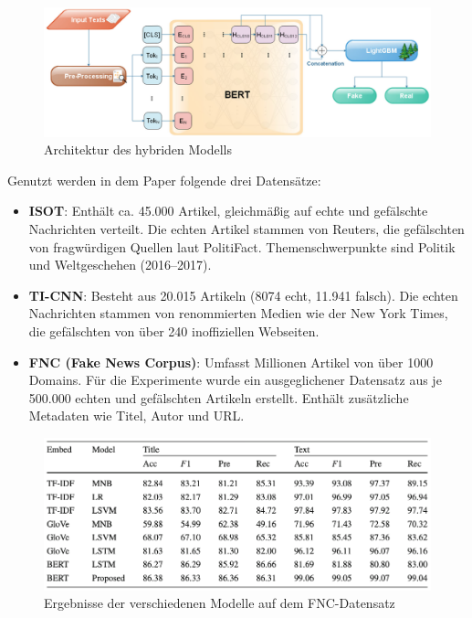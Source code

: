 \begin{figure}[htbp]
    \begin{center}
    \includegraphics[scale=0.32]{static/bert_lightgbt_architecture.png}
    \caption{\label{fig:bert_lightgbt_architecture} Architektur des hybriden Modells \cite{Essa:2023aa}}
    \end{center}
\end{figure}

Genutzt werden in dem Paper folgende drei Datensätze:
\begin{itemize}
  \item \textbf{ISOT}: Enthält ca. 45.000 Artikel, gleichmäßig auf echte und gefälschte Nachrichten verteilt. 
  Die echten Artikel stammen von Reuters, die gefälschten von fragwürdigen Quellen laut PolitiFact. 
  Themenschwerpunkte sind Politik und Weltgeschehen (2016–2017).

  \item \textbf{TI-CNN}: Besteht aus 20.015 Artikeln (8074 echt, 11.941 falsch). Die echten Nachrichten stammen von renommierten Medien 
  wie der New York Times, die gefälschten von über 240 inoffiziellen Webseiten.

  \item \textbf{FNC (Fake News Corpus)}: Umfasst Millionen Artikel von über 1000 Domains. Für die Experimente wurde ein ausgeglichener 
  Datensatz aus je 500.000 echten und gefälschten Artikeln erstellt. Enthält zusätzliche Metadaten wie Titel, Autor und URL.
\end{itemize}

\begin{figure}[htbp]
    \begin{center}
    \includegraphics[scale=0.4]{static/bert_lightgbt_results.png}
    \caption{\label{fig:bert_lightgbt_results} Ergebnisse der verschiedenen Modelle auf dem FNC-Datensatz \cite{Essa:2023aa}}
    \end{center}
\end{figure}

